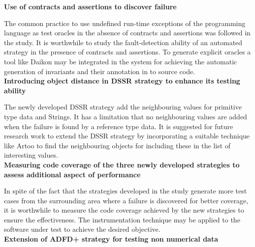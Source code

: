 \textbf{Use of contracts and assertions to discover failure}

The common practice to use undefined run-time exceptions of the programming language as test oracles in the absence of contracts and assertions was followed in the study. It is worthwhile to study the fault-detection ability of an automated strategy in the presence of contracts and assertions. To generate explicit oracles a tool like Daikon may be integrated in the system for achieving the automatic generation of invariants and their annotation in to source code.\\

\textbf{Introducing object distance in DSSR strategy to enhance its testing ability}

The newly developed DSSR strategy add the neighbouring values for primitive type data and Strings. It has a limitation that no neighbouring values are added when the failure is found by  a reference type data. It is suggested for future research work to extend the DSSR strategy by incorporating a suitable technique like Artoo to find the neighbouring objects for including these in the list of interesting values.  \\


\textbf{Measuring code coverage of the three newly developed strategies to assess additional aspect of performance}

In spite of the fact that the strategies developed in the study generate more test cases from the surrounding area where a failure is discovered for better coverage, it is worthwhile to measure the code coverage achieved by the new strategies to ensure the effectiveness. The instrumentation technique may be applied to the software under test to achieve the desired objective. \\

\textbf{Extension of ADFD+ strategy for testing non numerical data}

